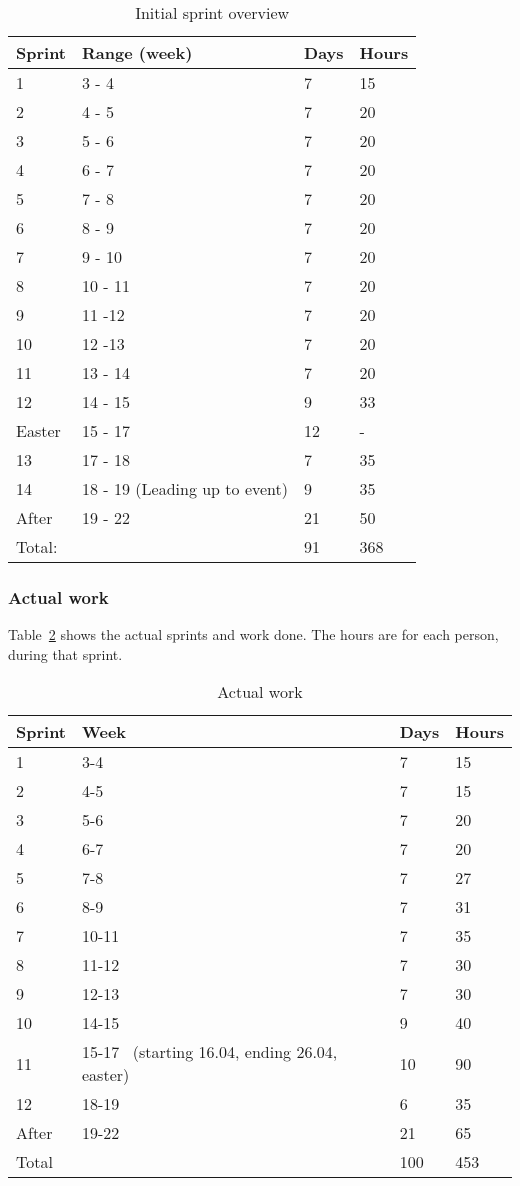 \begin{table}
\caption{Initial sprint overview}
\label{table:sprintoverview}
\begin{tabular}{|l|l|l|l|}
\hline
 Sprint & Range (week) & Days &
 Hours\\\hline
 1 & 3 - 4 & 7 & 15\\\hline
 2 & 4 - 5 & 7 & 20\\\hline
 3 & 5 - 6 & 7 & 20 \\\hline
 4 & 6 - 7 & 7 & 20 \\\hline
 5 & 7 - 8 & 7 & 20\\\hline
 6 & 8 - 9 & 7 & 20\\\hline
 7 & 9 - 10 & 7 & 20\\\hline
 8 & 10 - 11 & 7 & 20\\\hline
 9 & 11 -12 & 7 & 20\\\hline
 10 & 12 -13 & 7 & 20\\\hline
 11 & 13 - 14 & 7 & 20\\\hline
 12 & 14 - 15 & 9 & 33\\\hline
 Easter & 15 - 17 & 12 & {}-\\\hline
 13 & 17 - 18 & 7 & 35\\\hline
 14 & 18 - 19 (Leading up to event) & 9 & 35\\\hline
 After & 19 - 22 & 21 & 50\\\hline
 Total: & & 91 & 368\\\hline
\end{tabular}
\end{table}


\subsubsection{Actual work}
Table~\ref{table:actualWork} shows the actual sprints and work done. The hours
are for each person, during that sprint.
\begin{table}
\caption{Actual work}
\label{table:actualWork}
\begin{tabular}{|l|l|l|l|}
\hline
 Sprint & Week & Days & Hours \\\hline
 1 & 3-4 & 7 & 15\\\hline
 2 & 4-5  & 7  & 15\\\hline
 3 & 5-6 & 7  & 20\\\hline
 4 & 6-7 & 7 & 20\\\hline
 5 & 7-8 & 7 & 27\\\hline
 6 & 8-9  & 7  & 31\\\hline
 7 & 10-11 & 7  & 35\\\hline
 8 & 11-12 & 7 & 30\\\hline
 9 & 12-13 & 7  & 30\\\hline
 10 & 14-15 & 9 & 40\\\hline
 11 & 15-17 \ (starting 16.04, ending 26.04, easter) & 10 & 90\\\hline
 12 & 18-19 & 6 & 35\\\hline
 After & 19-22 & 21 & 65\\\hline
 Total & & 100 & 453\\\hline
\end{tabular}
\end{table}
